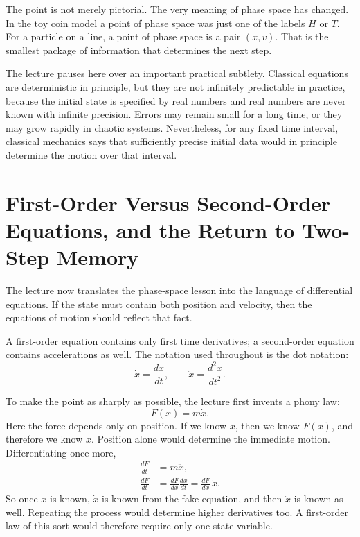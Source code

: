 The point is not merely pictorial. The very meaning of phase space has changed. In the toy coin model a point of phase space was just one of the labels \(H\) or \(T\). For a particle on a line, a point of phase space is a pair \((x,v)\). That is the smallest package of information that determines the next step.

\begin{remark}
The lecture pauses here over an important practical subtlety. Classical equations are deterministic in principle, but they are not infinitely predictable in practice, because the initial state is specified by real numbers and real numbers are never known with infinite precision. Errors may remain small for a long time, or they may grow rapidly in chaotic systems. Nevertheless, for any fixed time interval, classical mechanics says that sufficiently precise initial data would in principle determine the motion over that interval.
\end{remark}

\section{First-Order Versus Second-Order Equations, and the Return to Two-Step Memory}

The lecture now translates the phase-space lesson into the language of differential equations. If the state must contain both position and velocity, then the equations of motion should reflect that fact.

A first-order equation contains only first time derivatives; a second-order equation contains accelerations as well. The notation used throughout is the dot notation:
\[
\dot{x}=\frac{dx}{dt},\qquad \ddot{x}=\frac{d^2x}{dt^2}.
\]

To make the point as sharply as possible, the lecture first invents a phony law:
\begin{equation}
F(x)=m\dot{x}.
\end{equation}
Here the force depends only on position. If we know \(x\), then we know \(F(x)\), and therefore we know \(\dot{x}\). Position alone would determine the immediate motion. Differentiating once more,
\begin{align}
\frac{dF}{dt} &= m\ddot{x},\\
\frac{dF}{dt} &= \frac{dF}{dx}\frac{dx}{dt}=\frac{dF}{dx}\,\dot{x}.
\end{align}
So once \(x\) is known, \(\dot{x}\) is known from the fake equation, and then \(\ddot{x}\) is known as well. Repeating the process would determine higher derivatives too. A first-order law of this sort would therefore require only one state variable.

